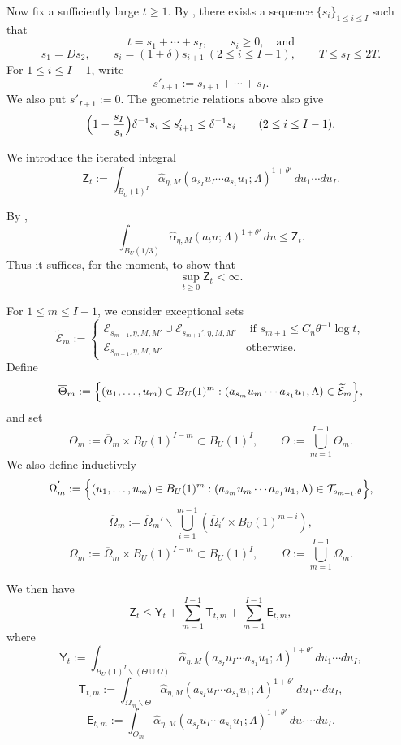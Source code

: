 \documentclass[reqno,11pt]{amsart}
\numberwithin{equation}{section}
\theoremstyle{definition}
\theoremstyle{remark}
\begin{document}
Now fix a sufficiently large $t\ge1$.
By , there exists a sequence
$\{s_i\}_{1\le i\le I}$ such that
$$
t=s_1+\cdots+s_I,
\qquad
s_i\ge0,\quad\text{and}
$$
$$
s_1=Ds_2,\qquad
s_i=(1+\delta)s_{i+1}\ (2\le i\le I-1),\qquad
T\le s_I\le 2T.
$$
For $1\le i\le I-1$, write
$$
s'_{i+1}:=s_{i+1}+\cdots+s_I.
$$
We also put $s'_{I+1}:=0$.
The geometric relations above also give
\begin{equation}\label{eq:tail-bound}
\Bigl(1-\frac{s_I}{s_i}\Bigr)\delta^{-1}s_i
\le s'_{i+1}
\le \delta^{-1}s_i
\qquad (2\le i\le I-1).
\end{equation}

We introduce the iterated integral
$$
\mathsf Z_{t}
:=
\int_{B_{U}(1)^I}
\widehat\alpha_{\eta,M}(a_{s_I}u_I\cdots a_{s_1}u_1;\Lambda)^{1+\theta'}
\,du_1\cdots du_I.
$$

By ,
\begin{equation}\label{eq:Ztexpression}
\int_{B_{U}(1/3)}
\widehat{\alpha}_{\eta,M}(a_tu;\Lambda)^{1+\theta'}\,du
\le \mathsf Z_{t}.
\end{equation}
Thus it suffices, for the moment, to show that
\begin{equation}\label{zt}
\sup_{t\ge0}\mathsf Z_{t}<\infty.
\end{equation}


\medskip

For $1\le m\le I-1$, we consider exceptional sets
$$
\widetilde{\mathcal{E}}_m:=\begin{cases}\mathcal E_{s_{m+1},\eta,M,M'}\cup \mathcal E_{s_{m+1}',\eta,M,M'}&\text{ if }s_{m+1}\leq C_n\theta^{-1}\log t,\\ \mathcal E_{s_{m+1},\eta,M,M'}&\text{otherwise}. \end{cases}
$$
Define
$$
\overline\Theta_m
:=
\Bigl\{(u_1,\dots,u_m)\in B_{U}(1)^m :
(a_{s_m}u_m\cdots a_{s_1}u_1,\Lambda)
\in \widetilde{\mathcal{E}}_m\Bigr\},
$$
and set
$$
\Theta_m:=\overline\Theta_m\times B_{U}(1)^{I-m}\subset B_{U}(1)^I,
\qquad
\Theta:=\bigcup_{m=1}^{I-1}\Theta_m.
$$
We also  define inductively
$$\overline\Omega_m':=\Bigl\{(u_1,\dots,u_m)\in B_{U}(1)^m :
(a_{s_m}u_m\cdots a_{s_1}u_1,\Lambda)
\in \mathcal T_{s_{m+1},\theta}\Bigr\},$$
$$\overline\Omega_m:=\overline\Omega_m'\smallsetminus\bigcup_{i=1}^{m-1}\left(\overline\Omega_i' \times B_{U}(1)^{m-i}\right),$$
$$\Omega_m:=\overline\Omega_m\times B_{U}(1)^{I-m}\subset B_{U}(1)^I, \qquad \Omega:=\bigcup_{m=1}^{I-1}\Omega_m.$$

We then have
$$
\mathsf Z_{t}\le \mathsf Y_{t}+\sum_{m=1}^{I-1}\mathsf T_{t,m}+\sum_{m=1}^{I-1}\mathsf E_{t,m},
$$
where
$$
\mathsf Y_{t}
:=
\int_{B_{U}(1)^I\smallsetminus (\Theta\cup \Omega)}
\widehat\alpha_{\eta,M}(a_{s_I}u_I\cdots a_{s_1}u_1;\Lambda)^{1+\theta'}
\,du_1\cdots du_I,
$$
$$
\mathsf T_{t,m}
:=
\int_{\Omega_m\smallsetminus \Theta}
\widehat\alpha_{\eta,M}(a_{s_I}u_I\cdots a_{s_1}u_1;\Lambda)^{1+\theta'}
\,du_1\cdots du_I,
$$
$$
\mathsf E_{t,m}
:=
\int_{\Theta_m}
\widehat\alpha_{\eta,M}(a_{s_I}u_I\cdots a_{s_1}u_1;\Lambda)^{1+\theta'}
\,du_1\cdots du_I.
$$
\end{document}
